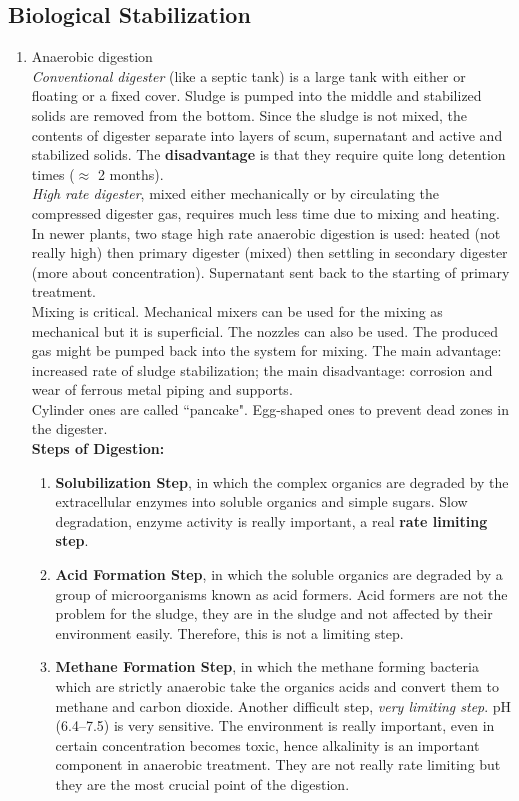 \documentclass{article}
\numberwithin{equation}{section}
\begin{document}
\subsection{Biological Stabilization}
\begin{enumerate}
    \item Anaerobic digestion\\
    \emph{Conventional digester} (like a septic tank) is a large tank with either or floating or a fixed cover. Sludge is pumped into the middle and stabilized solids are removed from the bottom. Since the sludge is not mixed, the contents of digester separate into layers of scum, supernatant and active and stabilized solids. The \textbf{disadvantage} is that they require quite long detention times ($\approx$ 2 months).\\
    \emph{High rate digester}, mixed either mechanically or by circulating the compressed digester gas, requires much less time due to mixing and heating. In newer plants, two stage high rate anaerobic digestion is used: heated (not really high) then primary digester (mixed) then settling in secondary digester (more about concentration). Supernatant sent back to the starting of primary treatment.\\
    Mixing is critical. Mechanical mixers can be used for the mixing as mechanical but it is superficial. The nozzles can also be used. The produced gas might be pumped back into the system for mixing. The main advantage: increased rate of sludge stabilization; the main disadvantage: corrosion and wear of ferrous metal piping and supports.\\
    Cylinder ones are called ``pancake". Egg-shaped ones to prevent dead zones in the digester.\\
    \textbf{Steps of Digestion:}
    \begin{enumerate}
        \item \textbf{Solubilization Step}, in which the complex organics are degraded by the extracellular enzymes into soluble organics and simple sugars. Slow degradation, enzyme activity is really important, a real \textbf{rate limiting step}.
        \item \textbf{Acid Formation Step}, in which the soluble organics are degraded by a group of microorganisms known as acid formers. Acid formers are not the problem for the sludge, they are in the sludge and not affected by their environment easily. Therefore, this is not a limiting step.
        \item \textbf{Methane Formation Step}, in which the methane forming bacteria which are strictly anaerobic take the organics acids and convert them to methane and carbon dioxide. Another difficult step, \emph{very limiting step}. pH (6.4--7.5) is very sensitive. The environment is really important, even  in certain concentration becomes toxic, hence alkalinity is an important component in anaerobic treatment. They are not really rate limiting but they are the most crucial point of the digestion.

\end{enumerate}
\end{enumerate}
\end{document}
